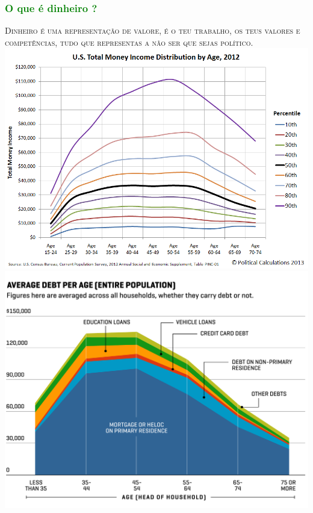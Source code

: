 \begin{frame}
\frametitle{\textcolor{green}{O que é dinheiro ?}}
\textsc{\large Dinheiro é uma representação de valore, é o teu trabalho, os teus valores e competências, tudo que representas a não ser que sejas político.}\\
\includegraphics[scale=0.2]{"./image/Career Path/Income 2012"}\hspace{0.8cm}
\includegraphics[scale=0.125]{"./image/Career Path/Debt"}
\end{frame}
